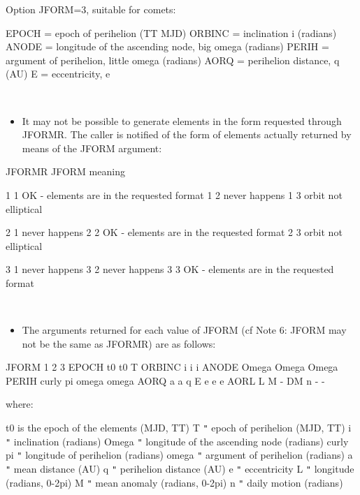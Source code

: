 \documentclass[twoside,11pt]{article}
\renewcommand{\_}{\texttt{\symbol{95}}}
\newcommand{\sstitemlist}[1]{
  \mbox{} \\
  \vspace{-3.5ex}
  \begin{itemize}
     #1
  \end{itemize}
}
\newcommand{\sstitem}{\item}
\newcommand{\sstitemlist}[1]{
      \begin{itemize}
         #1
      \end{itemize}
      \\
   }
\newcommand{\sstitem}{\item}
\begin{document}
{{           Option JFORM=3, suitable for comets:

           EPOCH  = epoch of perihelion (TT MJD)
           ORBINC = inclination i (radians)
           ANODE  = longitude of the ascending node, big omega (radians)
           PERIH  = argument of perihelion, little omega (radians)
           AORQ   = perihelion distance, q (AU)
           E      = eccentricity, e

      \sstitemlist{

         \sstitem
           It may not be possible to generate elements in the form
             requested through JFORMR.  The caller is notified of the form
             of elements actually returned by means of the JFORM argument:

      }
           JFORMR   JFORM     meaning

             1        1       OK - elements are in the requested format
             1        2       never happens
             1        3       orbit not elliptical

             2        1       never happens
             2        2       OK - elements are in the requested format
             2        3       orbit not elliptical

             3        1       never happens
             3        2       never happens
             3        3       OK - elements are in the requested format

      \sstitemlist{

         \sstitem
           The arguments returned for each value of JFORM (cf Note 6: JFORM
             may not be the same as JFORMR) are as follows:

      }
            JFORM         1              2              3
            EPOCH         t0             t0             T
            ORBINC        i              i              i
            ANODE         Omega          Omega          Omega
            PERIH         curly pi       omega          omega
            AORQ          a              a              q
            E             e              e              e
            AORL          L              M              -
            DM            n              -              -

        where:

            t0           is the epoch of the elements (MJD, TT)
            T              {\tt "}    epoch of perihelion (MJD, TT)
            i              {\tt "}    inclination (radians)
            Omega          {\tt "}    longitude of the ascending node (radians)
            curly pi       {\tt "}    longitude of perihelion (radians)
            omega          {\tt "}    argument of perihelion (radians)
            a              {\tt "}    mean distance (AU)
            q              {\tt "}    perihelion distance (AU)
            e              {\tt "}    eccentricity
            L              {\tt "}    longitude (radians, 0-2pi)
            M              {\tt "}    mean anomaly (radians, 0-2pi)
            n              {\tt "}    daily motion (radians)
      \sstitemlist{

}}}
\end{document}
